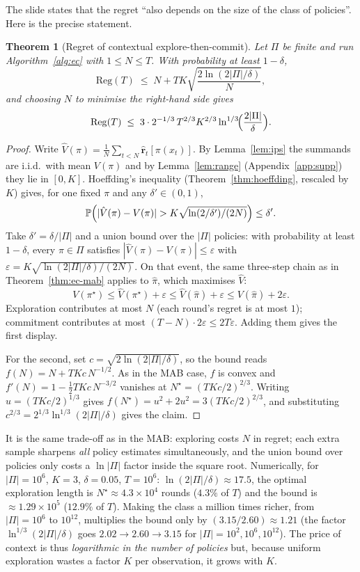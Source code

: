 \documentclass[11pt,a4paper]{article}
\newcommand{\Prob}{\mathbb{P}}
\newcommand{\rh}{\hat{\mathbf{r}}}
\theoremstyle{plain}
\newtheorem{theorem}{Theorem}[section]
\theoremstyle{definition}
\theoremstyle{remark}
\begin{document}
The slide states that the regret ``also depends on the size of the class of policies''. Here is the precise statement.

\begin{theorem}[Regret of contextual explore-then-commit]\label{thm:cec}
Let $\Pi$ be finite and run Algorithm~\ref{alg:ec} with $1\le N\le T$. With probability at least $1-\delta$,
\[
 \mathrm{Reg}(T)\;\le\;N+TK\sqrt{\frac{2\ln(2|\Pi|/\delta)}{N}},
\]
and choosing $N$ to minimise the right-hand side gives
\[
 \mathrm{Reg}(T)\;\le\;3\cdot2^{-1/3}\,T^{2/3}K^{2/3}\ln^{1/3}\!\Bigl(\frac{2|\Pi|}{\delta}\Bigr).
\]
\end{theorem}
\begin{proof}
Write $\hat V(\pi)=\frac1N\sum_{t<N}\rh_t[\pi(x_t)]$. By Lemma~\ref{lem:ips} the summands are i.i.d.\ with mean $V(\pi)$ and by Lemma~\ref{lem:range} (Appendix~\ref{app:supp})
they lie in $[0,K]$. Hoeffding's inequality (Theorem~\ref{thm:hoeffding}, rescaled by $K$) gives, for one fixed $\pi$ and any $\delta'\in(0,1)$,
\[
 \Prob\Bigl(|\hat V(\pi)-V(\pi)|>K\sqrt{\ln(2/\delta')/(2N)}\Bigr)\le\delta'.
\]
Take $\delta'=\delta/|\Pi|$ and a union bound over the $|\Pi|$ policies: with probability at least $1-\delta$, every $\pi\in\Pi$ satisfies
$|\hat V(\pi)-V(\pi)|\le\varepsilon$ with $\varepsilon=K\sqrt{\ln(2|\Pi|/\delta)/(2N)}$.
On that event, the same three-step chain as in Theorem~\ref{thm:ec-mab} applies to $\hat\pi$, which maximises $\hat V$:
\[
 V(\pi^\star)\le\hat V(\pi^\star)+\varepsilon\le\hat V(\hat\pi)+\varepsilon\le V(\hat\pi)+2\varepsilon .
\]
Exploration contributes at most $N$ (each round's regret is at most $1$); commitment contributes at most $(T-N)\cdot2\varepsilon\le2T\varepsilon$. Adding them gives the first display.

For the second, set $c=\sqrt{2\ln(2|\Pi|/\delta)}$, so the bound reads $f(N)=N+TKc\,N^{-1/2}$. As in the MAB case, $f$ is convex and
$f'(N)=1-\tfrac12TKc\,N^{-3/2}$ vanishes at $N^\star=(TKc/2)^{2/3}$. Writing $u=(TKc/2)^{1/3}$ gives $f(N^\star)=u^2+2u^2=3(TKc/2)^{2/3}$, and substituting
$c^{2/3}=2^{1/3}\ln^{1/3}(2|\Pi|/\delta)$ gives the claim.
\end{proof}

\begin{intuition}
It is the same trade-off as in the MAB: exploring costs $N$ in regret; each extra sample sharpens \emph{all} policy estimates simultaneously, and the union bound over policies only
costs a $\ln|\Pi|$ factor inside the square root. Numerically, for $|\Pi|=10^6$, $K=3$, $\delta=0.05$, $T=10^6$: $\ln(2|\Pi|/\delta)\approx17.5$,
the optimal exploration length is $N^\star\approx4.3\times10^4$ rounds ($4.3\%$ of $T$) and the bound is $\approx1.29\times10^5$ ($12.9\%$ of $T$).
Making the class a million times richer, from $|\Pi|=10^6$ to $10^{12}$, multiplies the bound only by $(3.15/2.60)\approx1.21$ (the factor $\ln^{1/3}(2|\Pi|/\delta)$ goes $2.02\to2.60\to3.15$ for $|\Pi|=10^2,10^6,10^{12}$).
The price of context is thus \emph{logarithmic in the number of policies} but, because uniform exploration wastes a factor $K$ per observation, it grows with $K$.
\end{intuition}
\end{document}
